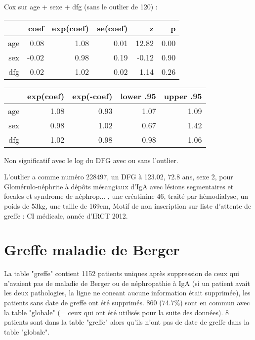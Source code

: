 \documentclass[11pt,a4paper]{article}\usepackage[]{graphicx}\usepackage[]{color}
\begin{document}
Cox sur age + sexe + dfg (sans le outlier de 120) :
\begin{table}[H]
\centering
\begin{tabular}{rrrrrr}
  \hline
 & coef & exp(coef) & se(coef) & z & p \\ 
  \hline
age & 0.08 & 1.08 & 0.01 & 12.82 & 0.00 \\ 
  sex & -0.02 & 0.98 & 0.19 & -0.12 & 0.90 \\ 
  dfg & 0.02 & 1.02 & 0.02 & 1.14 & 0.26 \\ 
   \hline
\end{tabular}
\end{table}
\begin{table}[H]
\centering
\begin{tabular}{rrrrr}
  \hline
 & exp(coef) & exp(-coef) & lower .95 & upper .95 \\ 
  \hline
age & 1.08 & 0.93 & 1.07 & 1.09 \\ 
  sex & 0.98 & 1.02 & 0.67 & 1.42 \\ 
  dfg & 1.02 & 0.98 & 0.98 & 1.06 \\ 
   \hline
\end{tabular}
\end{table}


Non significatif avec le log du DFG avec ou sans l'outlier.

L'outlier a comme numéro 228497, un DFG à 123.02, 72.8 ans, sexe 2, pour Glomérulo-néphrite à dépôts mésangiaux d'IgA avec lésions segmentaires et focales et syndrome de néphrop... , une créatinine 46, traité par hémodialyse, un poids de 53kg, une taille de 169cm, Motif de non inscription sur liste d'attente de greffe : CI médicale, année d'IRCT 2012.

  
\section{Greffe maladie de Berger}




La table "greffe" contient 1152 patients uniques après suppression de ceux qui n'avaient pas de maladie de Berger ou de néphropathie à IgA (si un patient avait les deux pathologies, la ligne ne coneant aucune information était supprimée), les patients sans date de greffe ont été supprimés. 860 (74.7\%) sont en commun avec la table "globale" (= ceux qui ont été utilisés pour la suite des données). 8 patients sont dans la table "greffe" alors qu'ils n'ont pas de date de greffe dans la table "globale".
~\\
\end{document}
